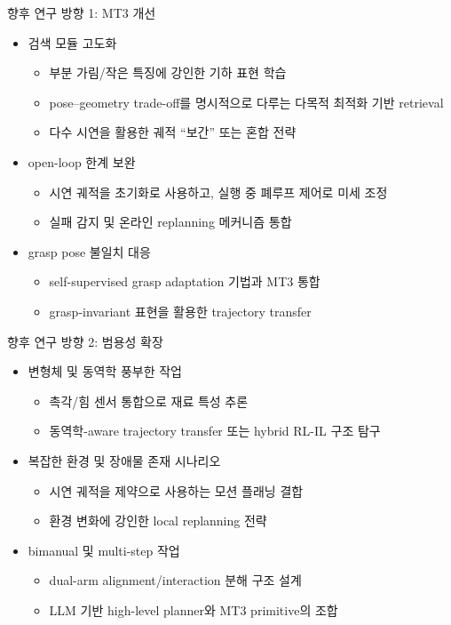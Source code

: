 \documentclass[aspectratio=169]{beamer}
\begin{document}
\begin{frame}{향후 연구 방향 1: MT3 개선}
  \small
  \begin{itemize}
    \item 검색 모듈 고도화
    \begin{itemize}
      \item 부분 가림/작은 특징에 강인한 기하 표현 학습
      \item pose–geometry trade-off를 명시적으로 다루는 다목적 최적화 기반 retrieval
      \item 다수 시연을 활용한 궤적 ``보간'' 또는 혼합 전략
    \end{itemize}
    \item open-loop 한계 보완
    \begin{itemize}
      \item 시연 궤적을 초기화로 사용하고, 실행 중 폐루프 제어로 미세 조정
      \item 실패 감지 및 온라인 replanning 메커니즘 통합
    \end{itemize}
    \item grasp pose 불일치 대응
    \begin{itemize}
      \item self-supervised grasp adaptation 기법과 MT3 통합
      \item grasp-invariant 표현을 활용한 trajectory transfer
    \end{itemize}
  \end{itemize}
\end{frame}

\begin{frame}{향후 연구 방향 2: 범용성 확장}
  \small
  \begin{itemize}
    \item 변형체 및 동역학 풍부한 작업
    \begin{itemize}
      \item 촉각/힘 센서 통합으로 재료 특성 추론
      \item 동역학-aware trajectory transfer 또는 hybrid RL-IL 구조 탐구
    \end{itemize}
    \item 복잡한 환경 및 장애물 존재 시나리오
    \begin{itemize}
      \item 시연 궤적을 제약으로 사용하는 모션 플래닝 결합
      \item 환경 변화에 강인한 local replanning 전략
    \end{itemize}
    \item bimanual 및 multi-step 작업
    \begin{itemize}
      \item dual-arm alignment/interaction 분해 구조 설계
      \item LLM 기반 high-level planner와 MT3 primitive의 조합
    \end{itemize}
  \end{itemize}
\end{frame}
\end{document}
